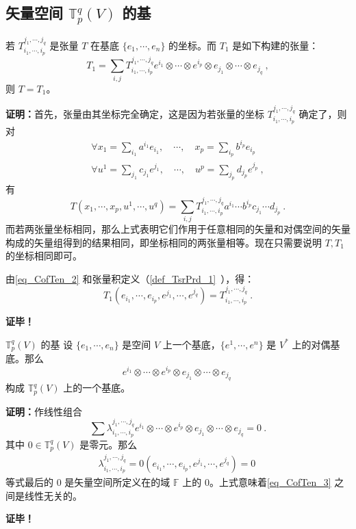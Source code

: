 \subsection{矢量空间 $\mathbb T^q_p(V)$ 的基}
\begin{theorem}{}\label{the_CofTen_1}
若 $T^{j_1,\cdots,j_q}_{i_1,\cdots,i_p}$ 是张量 $T$ 在基底 $\{e_1,\cdots,e_n\}$ 的坐标。而 $T_1$ 是如下构建的张量：
\begin{equation}\label{eq_CofTen_2}
T_1=\sum_{i,j}T^{j_1,\cdots,j_q}_{i_1,\cdots,i_p}e^{i_1}\otimes\cdots\otimes e^{i_p}\otimes e_{j_1}\otimes\cdots\otimes e_{j_q}~,
\end{equation}
则 $T=T_1$。
\end{theorem}
\textbf{证明：}首先，张量由其坐标完全确定，这是因为若张量的坐标 $T^{j_1,\cdots,j_q}_{i_1,\cdots,i_p}$ 确定了，则对
\begin{equation}
\begin{aligned}
\forall x_1=\sum_{i_1}a^{i_1}e_{i_1},\quad\cdots,\quad x_p=\sum_{i_p}b^{i_p}e_{i_p}\\
\forall u^1=\sum_{j_1}c_{j_1}e^{j_1},\quad\cdots,\quad u^p=\sum_{j_p}d_{j_p}e^{j_p}~,
\end{aligned}
\end{equation}
有 
\begin{equation}\label{eq_CofTen_1}
T(x_1,\cdots,x_p,u^1,\cdots,u^q)=\sum_{i,j}T^{j_1,\cdots,j_q}_{i_1,\cdots,i_p}a^{i_1}\cdots b^{i_p}c_{j_1}\cdots d_{j_p}~.
\end{equation}
而若两张量坐标相同，那么上式表明它们作用于任意相同的矢量和对偶空间的矢量构成的矢量组得到的结果相同，即坐标相同的两张量相等。现在只需要说明 $T,T_1$ 的坐标相同即可。

由\autoref{eq_CofTen_2} 和张量积定义（\autoref{def_TsrPrd_1}~），得：
\begin{equation}
T_1(e_{i_1},\cdots,e_{i_p},e^{j_1},\cdots,e^{j_q})=T^{j_1,\cdots,j_q}_{i_1,\cdots,i_p}~.
\end{equation}

\textbf{证毕！}
 \begin{theorem}{ $\mathbb T^q_p(V)$ 的基}\label{the_CofTen_2}
 设 $\{e_1,\cdots,e_n\}$ 是空间 $V$ 上一个基底，$\{e^1,\cdots,e^n\}$ 是 $V^*$ 上的对偶基底。那么
\begin{equation}\label{eq_CofTen_3}
e^{i_1}\otimes\cdots\otimes e^{i_p}\otimes e_{j_1}\otimes\cdots\otimes e_{j_q}~
\end{equation}
构成 $\mathbb T_p^q(V)$ 上的一个基底。 
 \end{theorem}
 \textbf{证明：}作线性组合
 \begin{equation}
 \sum\lambda^{j_1,\cdots,j_q}_{i_1,\cdots,i_p}e^{i_1}\otimes\cdots\otimes e^{i_p}\otimes e_{j_1}\otimes\cdots\otimes e_{j_q}=0~.
 \end{equation}
 其中 $0\in \mathbb T^q_p(V)$ 是零元。那么
 \begin{equation}
 \begin{aligned}
 \lambda^{j_1,\cdots,j_q}_{i_1,\cdots,i_p}=0(e_{i_1},\cdots,e_{i_p},e^{j_1},\cdots,e^{j_q})=0
 \end{aligned}
 ~
 \end{equation}
等式最后的 $0$ 是矢量空间所定义在的域 $\mathbb F$ 上的 $0$。上式意味着\autoref{eq_CofTen_3} 之间是线性无关的。

\textbf{证毕！}